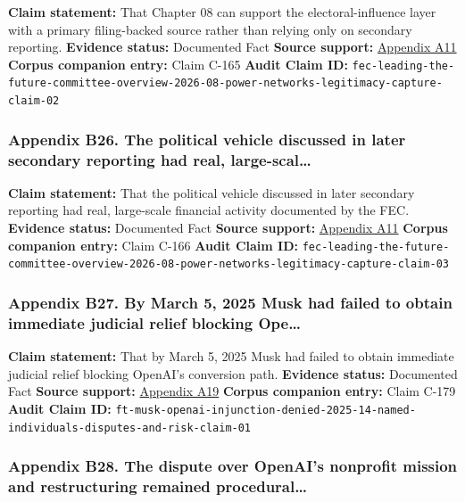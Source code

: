 \documentclass[
  american,
  11pt,
  letterpaper,
]{article}
\begin{document}
\textbf{Claim statement:} That Chapter 08 can support the
electoral-influence layer with a primary filing-backed source rather
than relying only on secondary reporting. \textbf{Evidence status:}
Documented Fact \textbf{Source support:}
\hyperref[ch-08-appendix-a11-leading-the-future-committee-overview]{Appendix
A11} \textbf{Corpus companion entry:} Claim C-165 \textbf{Audit Claim
ID:}
\texttt{fec-leading-the-future-committee-overview-2026-08-power-networks-legitimacy-capture-claim-02}

\subsubsection{Appendix B26. The political vehicle discussed in later
secondary reporting had real,
large-scal\ldots{}}\label{ch-08-appendix-b26-the-political-vehicle-discussed-in-later-secondary-reporting-had-real-large-scal}

\textbf{Claim statement:} That the political vehicle discussed in later
secondary reporting had real, large-scale financial activity documented
by the FEC. \textbf{Evidence status:} Documented Fact \textbf{Source
support:}
\hyperref[ch-08-appendix-a11-leading-the-future-committee-overview]{Appendix
A11} \textbf{Corpus companion entry:} Claim C-166 \textbf{Audit Claim
ID:}
\texttt{fec-leading-the-future-committee-overview-2026-08-power-networks-legitimacy-capture-claim-03}

\subsubsection{Appendix B27. By March 5, 2025 Musk had failed to obtain
immediate judicial relief blocking
Ope\ldots{}}\label{ch-08-appendix-b27-by-march-5-2025-musk-had-failed-to-obtain-immediate-judicial-relief-blocking-ope}

\textbf{Claim statement:} That by March 5, 2025 Musk had failed to
obtain immediate judicial relief blocking OpenAI's conversion path.
\textbf{Evidence status:} Documented Fact \textbf{Source support:}
\hyperref[ch-08-appendix-a19-judge-denies-elon-musks-attempt-to-immediately-block-openais-conversion-to-for-profit-entity]{Appendix
A19} \textbf{Corpus companion entry:} Claim C-179 \textbf{Audit Claim
ID:}
\texttt{ft-musk-openai-injunction-denied-2025-14-named-individuals-disputes-and-risk-claim-01}

\subsubsection{Appendix B28. The dispute over OpenAI's nonprofit mission
and restructuring remained
procedural\ldots{}}\label{ch-08-appendix-b28-the-dispute-over-openai-s-nonprofit-mission-and-restructuring-remained-procedural}
\end{document}
